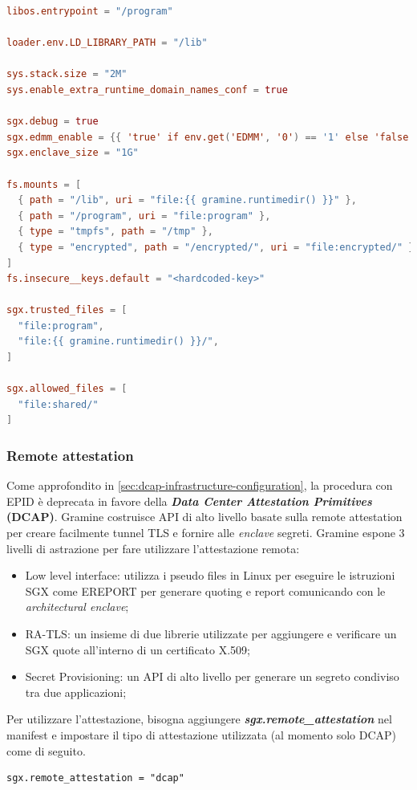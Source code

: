 \documentclass{article}
\begin{document}
\begin{lstlisting}[caption="Manifest con allowed\_files\,mountpoint di diversa e configurazione per l'enclave",label=lst:advanced-manifest, language=Toml]
libos.entrypoint = "/program"

loader.env.LD_LIBRARY_PATH = "/lib"

sys.stack.size = "2M"
sys.enable_extra_runtime_domain_names_conf = true

sgx.debug = true
sgx.edmm_enable = {{ 'true' if env.get('EDMM', '0') == '1' else 'false' }}
sgx.enclave_size = "1G"

fs.mounts = [
  { path = "/lib", uri = "file:{{ gramine.runtimedir() }}" },
  { path = "/program", uri = "file:program" },
  { type = "tmpfs", path = "/tmp" },
  { type = "encrypted", path = "/encrypted/", uri = "file:encrypted/" },
]
fs.insecure__keys.default = "<hardcoded-key>"

sgx.trusted_files = [
  "file:program",
  "file:{{ gramine.runtimedir() }}/",
]

sgx.allowed_files = [
  "file:shared/"
]
\end{lstlisting}

\subsubsection{Remote attestation}
Come approfondito in \cref{sec:dcap-infrastructure-configuration}, la procedura con EPID è deprecata in favore della \textbf{\textit{Data Center Attestation Primitives} (DCAP)}. Gramine costruisce API di alto livello basate sulla remote attestation per creare facilmente tunnel TLS e fornire alle \textit{enclave} segreti. Gramine espone $3$ livelli di astrazione per fare utilizzare l'attestazione remota:
\begin{itemize}
  \item Low level interface: utilizza i pseudo files in Linux per eseguire le istruzioni SGX come EREPORT per generare quoting e report comunicando con le \textit{architectural enclave};
  \item RA-TLS: un insieme di due librerie utilizzate per aggiungere e verificare un SGX quote all'interno di un certificato X.509;
  \item Secret Provisioning: un API di alto livello per generare un segreto condiviso tra due applicazioni;
\end{itemize}
Per utilizzare l'attestazione, bisogna aggiungere \textbf{\textit{sgx.remote\_attestation}} nel manifest e impostare il tipo di attestazione utilizzata (al momento solo DCAP) come di seguito. 
\begin{verbatim}
sgx.remote_attestation = "dcap"
\end{verbatim}
\end{document}
